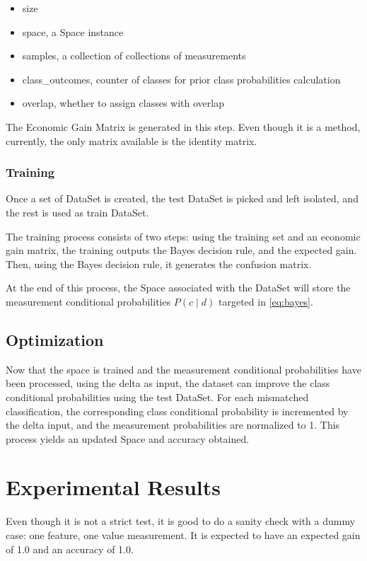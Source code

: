 \documentclass[letterpaper, conference]{IEEEtran}
\begin{document}
\begin{itemize}
\item size
\item space, a Space instance
\item samples, a collection of collections of measurements
\item class\_outcomes, counter of classes for prior class probabilities calculation
\item overlap, whether to assign classes with overlap
\end{itemize}

The Economic Gain Matrix is generated in this step. Even though it is a method, currently, the only matrix available is the identity matrix.

\subsubsection{Training}

Once a set of DataSet is created, the test DataSet is picked and left isolated, and the rest is used as train DataSet.

The training process consists of two steps: using the training set and an economic gain matrix, the training outputs the Bayes decision rule, and the expected gain. Then, using the Bayes decision rule, it generates the confusion matrix.


At the end of this process, the Space associated with the DataSet will store the measurement conditional probabilities $P(c \mid d)$ targeted in \ref{eq:bayes}.

\subsection{Optimization}

Now that the space is trained and the measurement conditional probabilities have been processed, using the delta as input, the dataset can improve the class conditional probabilities using the test DataSet. For each mismatched classification, the corresponding class conditional probability is incremented by the delta input, and the measurement probabilities are normalized to 1. This process yields an updated Space and accuracy obtained.

\section{Experimental Results}

Even though it is not a strict test, it is good to do a sanity check with a dummy case: one feature, one value measurement. It is expected to have an expected gain of 1.0 and an accuracy of 1.0.
\end{document}
